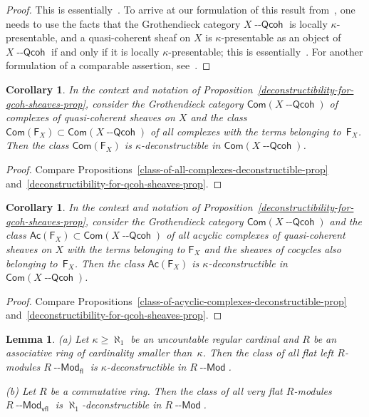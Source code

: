 \documentclass[12pt,a4paper]{amsart}
\newcommand{\+}{\protect\nobreakdash-}
\renewcommand{\:}{\colon}
\newcommand{\Modl}{{\operatorname{\mathsf{--Mod}}}}
\newcommand{\Qcoh}{{\operatorname{\mathsf{--Qcoh}}}}
\newcommand{\fl}{\mathsf{fl}}
\newcommand{\vfl}{\mathsf{vfl}}
\newcommand{\Com}{\mathsf{Com}}
\newcommand{\Ac}{\mathsf{Ac}}
\newcommand{\sF}{\mathsf F}
\theoremstyle{plain}
\newtheorem{lem}[thm]{Lemma}
\newtheorem{cor}[thm]{Corollary}
\theoremstyle{definition}
\begin{document}
\begin{proof}
 This is essentially~\cite[Notation~3.12 and Theorem~3.13]{EGPT}.
 To arrive at our formulation of this result from~\cite{EGPT}, one
needs to use the facts that the Grothendieck category $X\Qcoh$ is
locally $\kappa$\+presentable, and a quasi-coherent sheaf on $X$ is
$\kappa$\+presentable as an object of $X\Qcoh$ if and only if it
is locally $\kappa$\+presentable; this is
essentially~\cite[Remark~4.6]{PS6}.
 For another formulation of a comparable assertion,
see~\cite[Lemma~B.3.5]{Pcosh}.
\end{proof}

\begin{cor} \label{deconstructibility-for-cmplxes-qcoh-sheaves-cor}
 In the context and notation of
Proposition~\ref{deconstructibility-for-qcoh-sheaves-prop},
consider the Grothendieck category\/ $\Com(X\Qcoh)$ of complexes
of quasi-coherent sheaves on $X$ and the class\/
$\Com(\sF_X)\subset\Com(X\Qcoh)$ of all complexes with the terms
belonging to\/~$\sF_X$.
 Then the class\/ $\Com(\sF_X)$ is\/ $\kappa$\+deconstructible
in\/ $\Com(X\Qcoh)$.
\end{cor}

\begin{proof}
 Compare Propositions~\ref{class-of-all-complexes-deconstructible-prop}
and~\ref{deconstructibility-for-qcoh-sheaves-prop}.
\end{proof}

\begin{cor} \label{deconstructibty-for-acycl-cmplxs-qcoh-sheaves-cor}
 In the context and notation of
Proposition~\ref{deconstructibility-for-qcoh-sheaves-prop},
consider the Grothendieck category\/ $\Com(X\Qcoh)$ and the class\/
$\Ac(\sF_X)\subset\Com(X\Qcoh)$ of all acyclic complexes of
quasi-coherent sheaves on $X$ with the terms belonging to\/ $\sF_X$
and the sheaves of cocycles also belonging to\/~$\sF_X$.
 Then the class\/ $\Ac(\sF_X)$ is\/ $\kappa$\+deconstructible
in\/ $\Com(X\Qcoh)$.
\end{cor}

\begin{proof}
 Compare
Propositions~\ref{class-of-acyclic-complexes-deconstructible-prop}
and~\ref{deconstructibility-for-qcoh-sheaves-prop}.
\end{proof}

\begin{lem} \label{flat-very-flat-modules-deconstructible}
\textup{(a)} Let\/ $\kappa\ge\aleph_1$ be an uncountable regular
cardinal and $R$ be an associative ring of cardinality smaller
than\/~$\kappa$.
 Then the class of all flat left $R$\+modules $R\Modl_\fl$ is\/
$\kappa$\+deconstructible in $R\Modl$. \par
\textup{(b)} Let $R$ be a commutative ring.
 Then the class of all very flat $R$\+modules $R\Modl_\vfl$ is\/
$\aleph_1$\+deconstructible in $R\Modl$.
\end{lem}
\end{document}
